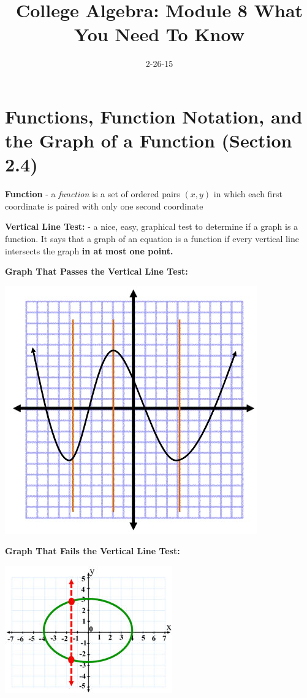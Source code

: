 \documentclass[12pt]{article}
\newenvironment{myindentpar}[1]%
     {\begin{list}{}%
             {\setlength{\leftmargin}{#1}}%
             \item[]%
     }
     {\end{list}}
\begin{document}
\title{College Algebra: Module 8 What You Need To Know}
\date{2-26-15}
\author{}
\maketitle


\section{Functions, Function Notation, and the Graph of a Function (Section 2.4)}

\textbf{Function} - a \textit{function} is a set of ordered pairs $(x,y)$ in which each first coordinate is paired with only one second coordinate

\textbf{Vertical Line Test:} - a nice, easy, graphical test to determine if a graph is a function. It says that a graph of an equation is a function if every vertical line intersects the graph \textbf{in at most one point.}

\begin{myindentpar}{1cm}

\textbf{Graph That Passes the Vertical Line Test:}

\centerline{\includegraphics{PassesVLT.jpg}}

\newpage

\textbf{Graph That Fails the Vertical Line Test:}

\centerline{\includegraphics{FailsVLT.jpg}}

\end{myindentpar}
\end{document}
